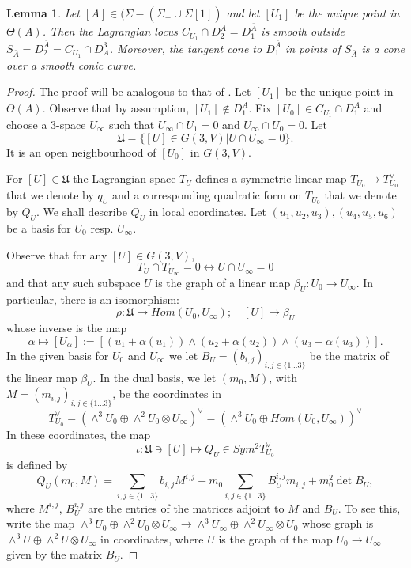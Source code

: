 \documentclass[a4paper,11pt]{amsart}
\newtheorem{lem}[thm]{Lemma}
\theoremstyle{definition}
\numberwithin{equation}{section}
\numberwithin{equation}{section} \theoremstyle{definition}
\begin{document}
  \begin{lem} \label{singularities of bar D1A} Let $[A]\in (\Sigma-(\Sigma_+\cup \Sigma[1])$  and let $[U_1]$ be the unique point in $\Theta(A)$. 
  Then the Lagrangian locus $C_{U_1}\cap D_2^A=D_1^{\bar{A}}$ is smooth outside $S_{\bar{A}}=D_2^{\bar{A}}=C_{U_1}\cap D^3_A$. 
  Moreover, the tangent cone to $D_1^{\bar{A}}$ in points of $S_{\bar{A}}$ is a cone over a smooth conic curve.
  \end{lem}
  \medskip
\begin{proof} The proof will be analogous to that  of \cite[Lemma 2.9]{EPWcubes}. 
 Let $[U_1]$ be the unique point in $\Theta(A)$. Observe that by assumption, $[U_1]\notin D_1^{\bar{A}}$. 
 Fix $[U_0]\in C_{U_1}\cap D_1^{\bar{A}}$ and choose a $3$-space $U_\infty$ such that $U_{\infty}\cap U_1=0$ and $U_{\infty}\cap U_0=0$. 
 Let $$\mathfrak{U}=\{[U]\in G(3,V)| U\cap U_\infty=0 \}.$$
 It is an open neighbourhood of $[U_0]$ in $G(3,V)$.
 
 For $[U]\in \mathfrak{U}$ the Lagrangian space $T_U$ defines a symmetric linear map $T_{U_0}\to T_{U_0}^\vee$ that we denote by $q_U
 $ and a corresponding  quadratic form on $T_{U_0}$ that we denote by $Q_U
 $. We shall describe $Q_U$ in local coordinates.  Let $(u_1,u_2,u_3), (u_4,u_5,u_6)$ be a basis for $U_0$ resp. $U_{\infty}$.
 
 Observe that  for any $[U]\in G(3,V)$,
  \[
T_U\cap T_{U_\infty}=0\leftrightarrow  U\cap {U_\infty}=0
 \] 
 and that any such subspace $U$ is the graph of a linear map $\beta_U:U_0\to U_{\infty}$.
 In particular, there is an isomorphism:
 \[
\rho: \mathfrak{U}\to Hom(U_0,U_{\infty}); \quad [U]\mapsto \beta_U
\]
whose inverse is the map
\[
 \alpha \mapsto [U_\alpha]:=[(u_1+\alpha(u_1))\wedge(u_2+\alpha(u_2))\wedge (u_3+\alpha(u_3))].
\]
In the given basis for $U_0$ and $U_\infty$ we let $B_U=(b_{i,j})_{i,j\in\{1\dots 3\}}$ be the matrix of the linear map $\beta_U$. In the dual basis, we let $(m_0, M)$, with $ M=(m_{i,j})_{i,j\in\{1\dots3\}}$, be the coordinates in
\[
T_{U_0}^{\vee}=(\wedge^3 U_0\oplus \wedge^2U_0\otimes U_\infty)^\vee=(\wedge^3 U_0\oplus Hom(U_0, U_\infty))^\vee
\]
  In these coordinates, the map 
  \[
  \iota: \mathfrak{U}\ni [U]\mapsto Q_U\in Sym^2 T_{U_0}^{\vee}
  \]
  is defined by
  \begin{equation}\label{eqquadrics}
  Q_U(m_0, M)=\sum_{i,j\in\{1\dots3\}} b_{i,j} M^{i,j} + m_0 \sum_{i,j\in\{1\dots3\}} B^{i,j}_U m_{i,j} + m_0^2 \det B_U, 
  \end{equation}
  where $M^{i,j}$, $B^{i,j}_U$ are the entries of the matrices adjoint to $M$ and $B_U$.
 To see this, write  the map $\wedge^3 U_0 \oplus \wedge^2 U_0\otimes U_{\infty} \to \wedge^3 U_{\infty} \oplus \wedge^2 U_{\infty}\otimes U_0  $
  whose graph is $ \wedge^3 U \oplus \wedge^2 U\otimes U_{\infty} $ in coordinates, where $U$ is the graph of the map $U_0\to U_{\infty}$ given by the matrix $B_U$.


\end{proof}
\end{document}
